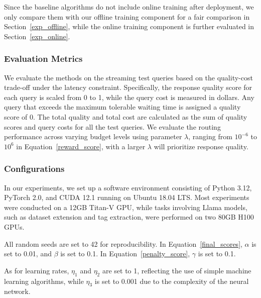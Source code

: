 Since the baseline algorithms do not include online training after deployment, we only compare them with our offline training component for a fair comparison in Section~\ref{exp_offline}, while the online training component is further evaluated in Section~\ref{exp_online}.


\subsubsection{Evaluation Metrics}

We evaluate the methods on the streaming test queries based on the quality-cost trade-off under the latency constraint.
Specifically, the response quality score for each query is scaled from 0 to 1, while the query cost is measured in dollars. 
Any query that exceeds the maximum tolerable waiting time is assigned a quality score of 0.
The total quality and total cost are calculated as the sum of quality scores and query costs for all the test queries.
We evaluate the routing performance across varying budget levels using parameter $\lambda$, ranging from $10^{-6}$ to $10^{6}$ in Equation~\eqref{reward_score}, with a larger $\lambda$ will prioritize response quality.

\subsubsection{Configurations}

In our experiments, we set up a software environment consisting of Python 3.12, PyTorch 2.0, and CUDA 12.1 running on Ubuntu 18.04 LTS.
Most experiments were conducted on a 12GB Titan-V GPU, while tasks involving Llama models, such as dataset extension and tag extraction, were performed on two 80GB H100 GPUs.

All random seeds are set to 42 for reproducibility. In Equation~\eqref{final_scores}, $\alpha$ is set to 0.01, and $\beta$ is set to 0.1. 
In Equation~\eqref{penalty_score}, $\gamma$ is set to 0.1.

As for learning rates, $\eta_1$ and $\eta_2$ are set to 1, reflecting the use of simple machine learning algorithms, while $\eta_3$ is set to 0.001 due to the complexity of the neural network.

